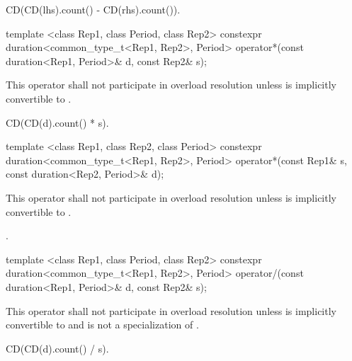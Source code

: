 \begin{itemdescr}
\pnum
\returns CD(CD(lhs).count() - CD(rhs).count()).
\end{itemdescr}

%
%
\begin{itemdecl}
template <class Rep1, class Period, class Rep2>
  constexpr duration<common_type_t<Rep1, Rep2>, Period>
  operator*(const duration<Rep1, Period>& d, const Rep2& s);
\end{itemdecl}

\begin{itemdescr}
\pnum
\remarks This operator shall not participate in overload
resolution unless  is implicitly convertible to .

\pnum
\returns CD(CD(d).count() * s).
\end{itemdescr}

%
%
\begin{itemdecl}
template <class Rep1, class Rep2, class Period>
  constexpr duration<common_type_t<Rep1, Rep2>, Period>
  operator*(const Rep1& s, const duration<Rep2, Period>& d);
\end{itemdecl}

\begin{itemdescr}
\pnum
\remarks This operator shall not participate in overload
resolution unless  is implicitly convertible to .

\pnum
\returns {}.
\end{itemdescr}

%
%
\begin{itemdecl}
template <class Rep1, class Period, class Rep2>
  constexpr duration<common_type_t<Rep1, Rep2>, Period>
  operator/(const duration<Rep1, Period>& d, const Rep2& s);
\end{itemdecl}

\begin{itemdescr}
\pnum
\remarks This operator shall not participate in overload
resolution unless  is implicitly convertible to 
and  is not a specialization of .

\pnum
\returns CD(CD(d).count() / s).
\end{itemdescr}


